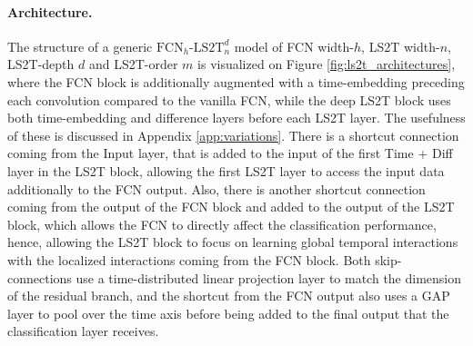 \documentclass{article} \usepackage{iclr2021_conference,times}
\newcommand{\FCNLStwoTwidth}[3]{\ensuremath{\text{FCN}_{#1}\text{-}\text{LS2T}_{#2}^{#3}}}
\theoremstyle{plain}
\theoremstyle{definition}
\begin{document}
	




\paragraph{Architecture.} The structure of a generic \FCNLStwoTwidth{h}{n}{d} model of FCN width-$h$, LS2T width-$n$, LS2T-depth $d$ and LS2T-order $m$ is visualized on Figure \ref{fig:ls2t_architectures}, where the FCN block is additionally augmented with a time-embedding preceding each convolution compared to the vanilla FCN, while the deep LS2T block uses both time-embedding and difference layers before each LS2T layer. The usefulness of these is discussed in Appendix \ref{app:variations}. There is a shortcut connection coming from the {\sc Input} layer, that is added to the input of the first {\sc Time + Diff} layer in the LS2T block, allowing the first LS2T layer to access the input data additionally to the FCN output. Also, there is another shortcut connection coming from the output of the FCN block and added to the output of the LS2T block, which allows the FCN to directly affect the classification performance, hence, allowing the LS2T block to focus on learning global temporal interactions with the localized interactions coming from the FCN block. Both skip-connections use a time-distributed linear projection layer to match the dimension of the residual branch, and the shortcut from the FCN output also uses a GAP layer to pool over the time axis before being added to the final output that the classification layer receives.
\end{document}
